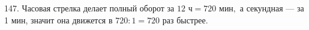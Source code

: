 147. Часовая стрелка делает полный оборот за $12\text{ ч}=720\text{ мин},$ а секундная --- за 1 мин, значит она движется в $720:1=720$ раз быстрее.\\
